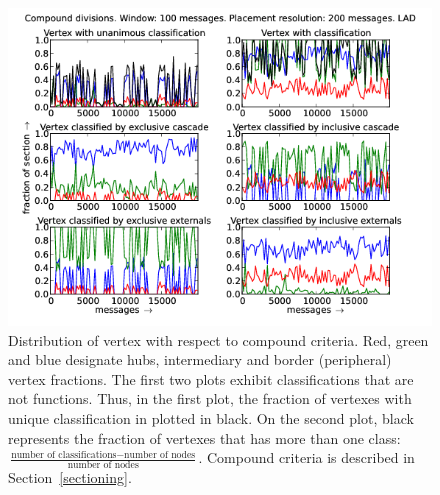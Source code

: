 \documentclass[%
 aip,
 jmp,%
 amsmath,amssymb,
 reprint,%
]{revtex4-1}
\begin{document}
\begin{figure}[hbtp] 
   \centering
        \includegraphics[width=\textwidth]{figs/LAD/100_2}
    \caption{Distribution of vertex with respect to compound criteria. Red, green and blue designate hubs, intermediary and border (peripheral) vertex fractions. The first two plots exhibit classifications that are not functions. Thus, in the first plot, the fraction of vertexes with unique classification in plotted in black. On the second plot, black represents the fraction of vertexes that has more than one class: $\frac{\text{number of classifications} - \text{number of nodes}}{\text{number of nodes}}$. Compound criteria is described in Section~\ref{sectioning}.}
    \label{fig:lad100_}
\end{figure}
\end{document}
